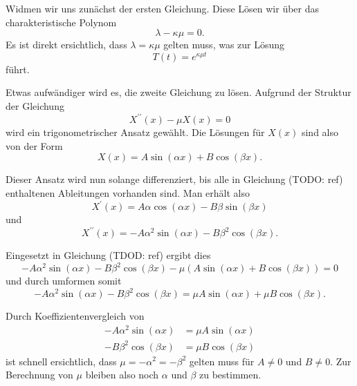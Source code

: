 Widmen wir uns zunächst der ersten Gleichung. Diese Lösen wir über das
charakteristische Polynom
\begin{equation}
    \lambda - \kappa \mu
    =
    0.
\end{equation}
Es ist direkt ersichtlich, dass $\lambda = \kappa \mu$ gelten muss, was zur
Lösung
\begin{equation}
    T(t)
    =
    e^{\kappa \mu t}
\end{equation}
führt.

Etwas aufwändiger wird es, die zweite Gleichung zu lösen. Aufgrund der Struktur
der Gleichung
\begin{equation}
    X^{\prime \prime}(x) - \mu X(x)
    =
    0
\end{equation}
wird ein trigonometrischer Ansatz gewählt. Die Lösungen für $X(x)$ sind also
von der Form
\begin{equation}
    X(x)
    =
    A \sin \left( \alpha x\right) + B \cos \left( \beta x\right).
\end{equation}

Dieser Ansatz wird nun solange differenziert, bis alle in Gleichung (TODO: ref)
enthaltenen Ableitungen vorhanden sind. Man erhält also
\begin{equation}
    X^{\prime}(x)
    =
    A \alpha \cos \left( \alpha x \right) -
    B \beta \sin \left( \beta x \right)
\end{equation}
und
\begin{equation}
    X^{\prime \prime}(x)
    =
    -A \alpha^{2} \sin \left( \alpha x \right) -
    B \beta^{2} \cos \left( \beta x \right).
\end{equation}

Eingesetzt in Gleichung (TDOD: ref) ergibt dies
\begin{equation}
    -A\alpha^{2}\sin(\alpha x) - B\beta^{2}\cos(\beta x) -
    \mu\left(A\sin(\alpha x) + B\cos(\beta x)\right)
    =
    0
\end{equation}
und durch umformen somit
\begin{equation}
    -A\alpha^{2}\sin(\alpha x) - B\beta^{2}\cos(\beta x)
    =
    \mu A\sin(\alpha x) + \mu B\cos(\beta x).
\end{equation}

Durch Koeffizientenvergleich von
\begin{equation}
\begin{aligned}
    -A\alpha^{2}\sin(\alpha x)
    &=
    \mu A\sin(\alpha x)
    \\
    -B\beta^{2}\cos(\beta x)
    &=
    \mu B\cos(\beta x)
\end{aligned}
\end{equation}
ist schnell ersichtlich, dass $ \mu = -\alpha^{2} = -\beta^{2} $ gelten muss für
$ A \neq 0 $ und $ B \neq 0 $. Zur Berechnung von $ \mu $ bleiben also noch 
$ \alpha $ und $ \beta $ zu bestimmen.

